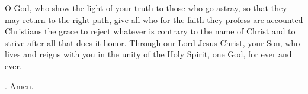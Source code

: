 \lettrine[lines=3]{O}{} God, who show the light of your truth
to those who go astray,
so that they may return to the right path,
give all who for the faith they profess
are accounted Christians
the grace to reject whatever is contrary to the name of Christ
and to strive after all that does it honor.
Through our Lord Jesus Christ, your Son,
who lives and reigns with you in the unity of the Holy Spirit,
one God, for ever and ever. \par \Rbar. Amen.
